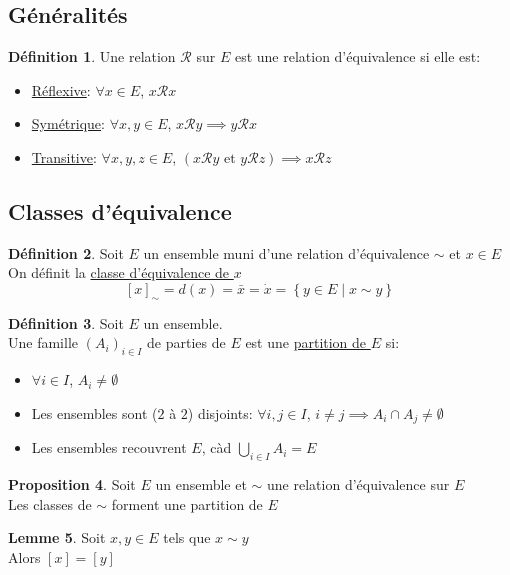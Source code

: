 \documentclass[10pt,a4paper]{article}
\theoremstyle{definition}
\newtheorem{proposition}{Proposition}[section]
\newtheorem{lemme}[proposition]{Lemme}
\newtheorem{definition}[proposition]{Définition}
\begin{document}
\subsection{Généralités}
\begin{definition}
Une relation $\mathrel\mathcal{R}$ sur $E$ est une relation d'équivalence si elle est:
\begin{itemize}
\item \uline{Réflexive}: $\forall x \in E$, $x \mathrel\mathcal{R} x$
\item \uline{Symétrique}: $\forall x, y \in E$, $x \mathrel\mathcal{R} y \implies y \mathrel\mathcal{R} x$
\item \uline{Transitive}: $\forall x, y, z \in E$, $(x \mathrel\mathcal{R} y \text{ et } y \mathrel\mathcal{R} z) \implies x \mathrel\mathcal{R} z$
\end{itemize}
\end{definition}

\subsection{Classes d'équivalence}
\begin{definition}
Soit $E$ un ensemble muni d'une relation d'équivalence $\sim$ et $x \in E$ \\
On définit la \uline{classe d'équivalence de $x$}
\[ \left[x\right]_\sim = d(x) = \bar{x} = \dot{x} = \left\{ y \in E \mid x \sim y \right\} \]
\end{definition}
\begin{definition}
Soit $E$ un ensemble. \\
Une famille $(A_i)_{i \in I}$ de parties de $E$ est une \uline{partition de $E$} si:
\begin{itemize}
\item $\forall i \in I$, $A_i \neq \emptyset$
\item Les ensembles sont ($2$ à $2$) disjoints: $\forall i, j \in I$, $i \neq j \implies A_i \cap A_j \neq \emptyset$
\item Les ensembles recouvrent $E$, càd $\bigcup\limits_{i \in I} A_i = E$
\end{itemize}
\end{definition}
\begin{proposition}
Soit $E$ un ensemble et $\sim$ une relation d'équivalence sur $E$ \\
Les classes de $\sim$ forment une partition de $E$
\end{proposition}
\begin{lemme}
Soit $x, y \in E$ tels que $x \sim y$ \\
Alors $\left[ x \right] = \left[ y \right]$
\end{lemme}
\end{document}
